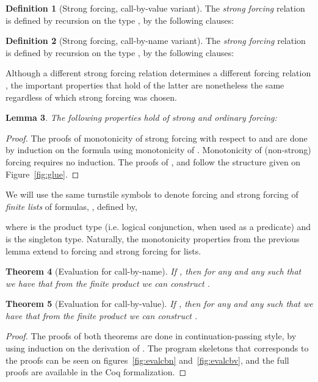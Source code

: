 \documentclass{eptcs}
\theoremstyle{definition}
\newtheorem{definition}{Definition}[section]
\theoremstyle{plain}
\newtheorem{lemma}[definition]{Lemma}
\newtheorem{theorem}[definition]{Theorem}
\theoremstyle{remark}
\begin{document}
\begin{definition}[Strong forcing, call-by-value variant] The \emph{strong forcing} relation  is defined by recursion on the type , by the following clauses:

\end{definition}

\begin{definition}[Strong forcing, call-by-name variant] The \emph{strong forcing} relation  is defined by recursion on the type , by the following clauses:

\end{definition}

Although a different strong forcing relation  determines a different forcing relation , the important properties that hold of the latter are nonetheless the same regardless of which strong forcing was chosen.

\begin{lemma} The following properties hold of strong and ordinary forcing:
  
\end{lemma}
\begin{proof} The proofs of monotonicity of strong forcing with respect to  and  are done by induction on the formula  using monotonicity of . Monotonicity of (non-strong) forcing requires no induction. The proofs of , and  follow the structure given on Figure~\ref{fig:glue}.
\end{proof}

We will use the same turnstile symbols to denote forcing and strong forcing of \emph{finite lists} of formulas, , defined by,

where  is the product type (i.e. logical conjunction, when used as a predicate) and  is the singleton type. Naturally, the monotonicity properties from the previous lemma extend to forcing and strong forcing for lists.

\begin{theorem}[Evaluation for call-by-name]\label{thm:eval:cbn} If , then for any  and any  such that  we have that from the finite product  we can construct .
\end{theorem}
\begin{theorem}[Evaluation for call-by-value]\label{thm:eval:cbv} If , then for any  and any  such that  we have that from the finite product  we can construct .
\end{theorem}
\begin{proof}The proofs of both theorems are done in continuation-passing style, by using induction on the derivation of . The program skeletons that corresponds to the proofs can be seen on figures~\ref{fig:evalcbn} and~\ref{fig:evalcbv}, 
 and the full proofs are available in the Coq formalization.\end{proof}
\end{document}
